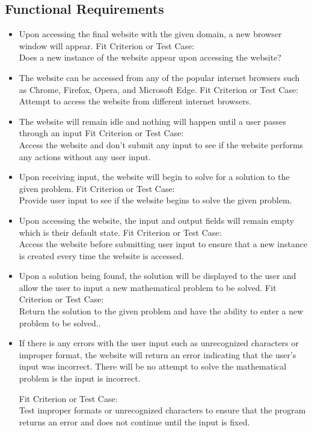 \documentclass[11pt, oneside]{article}
\begin{document}
\subsection{Functional Requirements}
\begin{itemize}
\item
Upon accessing the final website with the given domain, a new browser window will appear.
\subitem
Fit Criterion or Test Case: \\
Does a new instance of the website appear upon accessing the website?

\item
The website can be accessed from any of the popular internet browsers such as Chrome, Firefox, Opera, and Microsoft Edge.
\subitem
Fit Criterion or Test Case: \\
Attempt to access the website from different internet browsers.

\item
The website will remain idle and nothing will happen until a user passes through an input
\subitem
Fit Criterion or Test Case: \\
Access the website and don’t submit any input to see if the website performs any actions without any user input.

\item
Upon receiving input, the website will begin to solve for a solution to the given problem.
\subitem
Fit Criterion or Test Case: \\
Provide user input to see if the website begins to solve the given problem.

\item
Upon accessing the website, the input and output fields will remain empty which is their default state.
\subitem
Fit Criterion or Test Case: \\
Access the website before submitting user input to ensure that a new instance is created every time the website is accessed.

\item
Upon a solution being found, the solution will be displayed to the user and allow the user to input a new mathematical problem to be solved.
\subitem
Fit Criterion or Test Case: \\
Return the solution to the given problem and have the ability to enter a new problem to be solved..

\item
If there is any errors with the user input such as unrecognized characters or improper format, the website will return an error indicating that the user’s input was incorrect. There will be no attempt to solve the mathematical problem is the input is incorrect.

\subitem
Fit Criterion or Test Case: \\
Test improper formats or unrecognized characters to ensure that the program returns an error and does not continue until the input is fixed.

\end{itemize}
\end{document}
